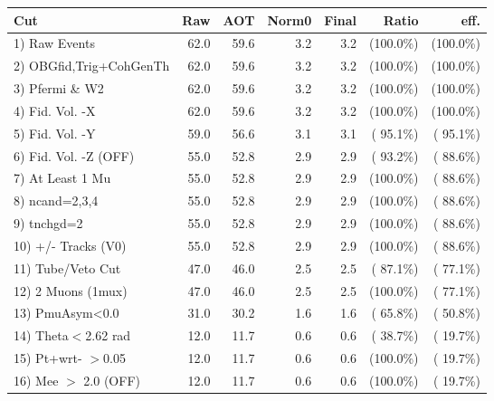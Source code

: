  \begin{table}[h!]\centering
 \begin{tabular}{||l||r|r|r|r|r|r||}
 \hline
 \hline
 Cut & Raw & AOT & Norm0 & Final & Ratio & eff.       \\
 \hline
  1) Raw Events           &         62.0 &         59.6 &          3.2 &          3.2 & (100.0\%) & (100.0\%) \\
  2) OBGfid,Trig+CohGenTh &         62.0 &         59.6 &          3.2 &          3.2 & (100.0\%) & (100.0\%) \\
  3) Pfermi \& W2         &         62.0 &         59.6 &          3.2 &          3.2 & (100.0\%) & (100.0\%) \\
  4) Fid. Vol. -X         &         62.0 &         59.6 &          3.2 &          3.2 & (100.0\%) & (100.0\%) \\
  5) Fid. Vol. -Y         &         59.0 &         56.6 &          3.1 &          3.1 & ( 95.1\%) & ( 95.1\%) \\
  6) Fid. Vol. -Z (OFF)   &         55.0 &         52.8 &          2.9 &          2.9 & ( 93.2\%) & ( 88.6\%) \\
  7) At Least 1 Mu        &         55.0 &         52.8 &          2.9 &          2.9 & (100.0\%) & ( 88.6\%) \\
  8) ncand=2,3,4          &         55.0 &         52.8 &          2.9 &          2.9 & (100.0\%) & ( 88.6\%) \\
  9) tnchgd=2             &         55.0 &         52.8 &          2.9 &          2.9 & (100.0\%) & ( 88.6\%) \\
 10) +/- Tracks (V0)      &         55.0 &         52.8 &          2.9 &          2.9 & (100.0\%) & ( 88.6\%) \\
 11) Tube/Veto Cut        &         47.0 &         46.0 &          2.5 &          2.5 & ( 87.1\%) & ( 77.1\%) \\
 12) 2 Muons (1mux)       &         47.0 &         46.0 &          2.5 &          2.5 & (100.0\%) & ( 77.1\%) \\
 13) PmuAsym<0.0          &         31.0 &         30.2 &          1.6 &          1.6 & ( 65.8\%) & ( 50.8\%) \\
 14) Theta$<$2.62 rad     &         12.0 &         11.7 &          0.6 &          0.6 & ( 38.7\%) & ( 19.7\%) \\
 15) Pt+wrt- $>$0.05      &         12.0 &         11.7 &          0.6 &          0.6 & (100.0\%) & ( 19.7\%) \\
 16) Mee $>$ 2.0  (OFF)   &         12.0 &         11.7 &          0.6 &          0.6 & (100.0\%) & ( 19.7\%) \\

\end{tabular}
\end{table}

